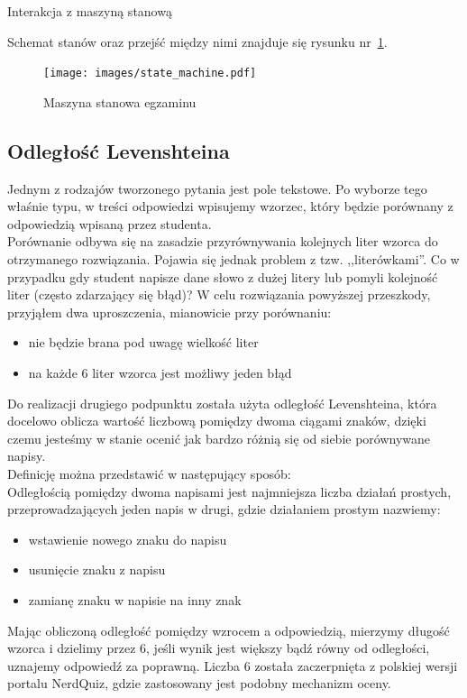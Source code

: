 \documentclass[a4paper,12pt]{article}
\begin{document}
\begin{listing}
  
  \caption{Interakcja z maszyną stanową}
  \label{listing:state_machine_transitions}
\end{listing}


Schemat stanów oraz przejść między nimi znajduje się rysunku nr~\ref{fig:state_machine}.

\begin{figure}[ht]
  \begin{center}
    \texttt{[image: images/state\_machine.pdf]}
  \end{center}
  \caption{Maszyna stanowa egzaminu}
  \label{fig:state_machine}
\end{figure}


\subsection{Odległość Levenshteina}\label{sec:levenshtein}
Jednym z rodzajów tworzonego pytania jest pole tekstowe. Po wyborze tego właśnie typu, w
treści odpowiedzi wpisujemy wzorzec, który będzie porównany z odpowiedzią wpisaną przez
studenta.\\
Porównanie odbywa się na zasadzie przyrównywania kolejnych liter wzorca do otrzymanego
rozwiązania. Pojawia się jednak problem z tzw. ,,literówkami''. Co w przypadku gdy student
napisze dane słowo z dużej litery lub pomyli kolejność liter (często zdarzający się błąd)?
W celu rozwiązania powyższej przeszkody, przyjąłem dwa uproszczenia, mianowicie przy
porównaniu:
\begin{itemize}
  \item nie będzie brana pod uwagę wielkość liter
  \item na każde 6 liter wzorca jest możliwy jeden błąd
\end{itemize}
Do realizacji drugiego podpunktu została użyta odległość Levenshteina, która docelowo
oblicza wartość liczbową pomiędzy dwoma ciągami znaków, dzięki czemu jesteśmy w stanie
ocenić jak bardzo różnią się od siebie porównywane napisy.\\
Definicję można przedstawić w następujący sposób: \cite{levenshtein}\\
Odległością pomiędzy dwoma napisami jest najmniejsza liczba działań prostych,
przeprowadzających jeden napis w drugi, gdzie działaniem prostym nazwiemy:
\begin{itemize}
  \item wstawienie nowego znaku do napisu
  \item usunięcie znaku z napisu
  \item zamianę znaku w napisie na inny znak
\end{itemize}
Mając obliczoną odległość pomiędzy wzrocem a odpowiedzią, mierzymy długość wzorca i
dzielimy przez 6, jeśli wynik jest większy bądź równy od odległości, uznajemy odpowiedź
za poprawną. Liczba 6 została zaczerpnięta z polskiej wersji portalu NerdQuiz, gdzie
zastosowany jest podobny mechanizm oceny.

\clearpage


\end{document}
